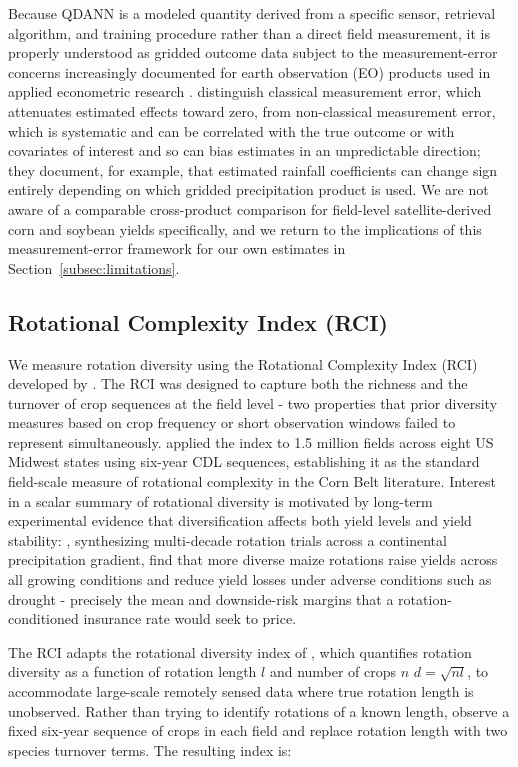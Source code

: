 \documentclass[12pt,letterpaper]{article}
\theoremstyle{remark}
\theoremstyle{remark}
\theoremstyle{plain}
\theoremstyle{definition}
\begin{document}
Because QDANN is a modeled quantity derived from a specific sensor, retrieval algorithm, and training procedure rather than a direct field measurement, it is properly understood as gridded outcome data subject to the measurement-error concerns increasingly documented for earth observation (EO) products used in applied econometric research \citep{Benami2026}. \citet{Benami2026} distinguish classical measurement error, which attenuates estimated effects toward zero, from non-classical measurement error, which is systematic and can be correlated with the true outcome or with covariates of interest and so can bias estimates in an unpredictable direction; they document, for example, that estimated rainfall coefficients can change sign entirely depending on which gridded precipitation product is used. We are not aware of a comparable cross-product comparison for field-level satellite-derived corn and soybean yields specifically, and we return to the implications of this measurement-error framework for our own estimates in Section~\ref{subsec:limitations}.
    
\subsection{\label{subsec:rci}Rotational Complexity Index (RCI)}	
We measure rotation diversity using the Rotational Complexity Index (RCI) developed by \citet{socolar2021}. The RCI was designed to capture both the richness and the turnover of crop sequences at the field level - two properties that prior diversity measures based on crop frequency or short observation windows failed to represent simultaneously. \citet{socolar2021} applied the index to 1.5 million fields across eight US Midwest states using six-year CDL sequences, establishing it as the standard field-scale measure of rotational complexity in the Corn Belt literature. Interest in a scalar summary of rotational diversity is motivated by long-term experimental evidence that diversification affects both yield levels and yield stability: \citet{bowles2020}, synthesizing multi-decade rotation trials across a continental precipitation gradient, find that more diverse maize rotations raise yields across all growing conditions and reduce yield losses under adverse conditions such as drought - precisely the mean and downside-risk margins that a rotation-conditioned insurance rate would seek to price.

The RCI adapts the rotational diversity index of \citet{Tiemann2016}, which quantifies rotation diversity as a function of rotation length $l$ and number of crops $n$ $d = \sqrt{nl}$, to accommodate large-scale remotely sensed data where true rotation length is unobserved. Rather than trying to identify rotations of a known length, \citet{socolar2021} observe a fixed six-year sequence of crops in each field and replace rotation length with two species turnover terms. The resulting index is:
\end{document}
